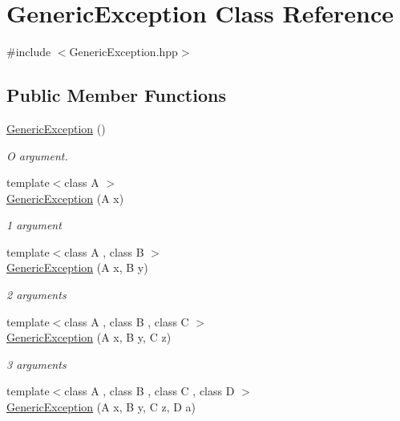 \hypertarget{classGenericException}{\section{Generic\-Exception Class Reference}
\label{classGenericException}
}


{\ttfamily \#include $<$Generic\-Exception.\-hpp$>$}

\subsection*{Public Member Functions}
\begin{DoxyCompactItemize}
\item 
\hyperlink{classGenericException_a65f9b6d9f5f5c1e4604a1665ef4569fd}{Generic\-Exception} ()
\begin{DoxyCompactList}\small\item\em O argument. \end{DoxyCompactList}\item 
{\footnotesize template$<$class A $>$ }\\\hyperlink{classGenericException_a0f62f3365b63854f37188a7a31e7fbe1}{Generic\-Exception} (A x)
\begin{DoxyCompactList}\small\item\em 1 argument \end{DoxyCompactList}\item 
{\footnotesize template$<$class A , class B $>$ }\\\hyperlink{classGenericException_a3a2b21b1c0027f1ef551f2f5431b61da}{Generic\-Exception} (A x, B y)
\begin{DoxyCompactList}\small\item\em 2 arguments \end{DoxyCompactList}\item 
{\footnotesize template$<$class A , class B , class C $>$ }\\\hyperlink{classGenericException_ab3547c41812140b116a0df55d6a3d29d}{Generic\-Exception} (A x, B y, C z)
\begin{DoxyCompactList}\small\item\em 3 arguments \end{DoxyCompactList}\item 
{\footnotesize template$<$class A , class B , class C , class D $>$ }\\\hyperlink{classGenericException_acfd0f9b1e4fd731467ae91f56f22a8d7}{Generic\-Exception} (A x, B y, C z, D a)

\end{DoxyCompactItemize}
